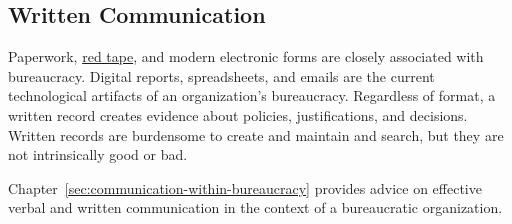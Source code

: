 \subsection*{Written Communication\label{sec:written-communication}}

Paperwork,  \href{https://en.wikipedia.org/wiki/Red_tape}{red tape},
and modern electronic forms are closely associated with bureaucracy.
Digital reports, spreadsheets, and emails are the current technological artifacts of an organization's bureaucracy. Regardless of format, a written record creates evidence about policies, justifications, and decisions. %
Written records are burdensome to create and maintain and search, but they are not intrinsically good or bad. 

Chapter~\ref{sec:communication-within-bureaucracy} 
provides advice on effective verbal and written communication in the context of a bureaucratic organization. 